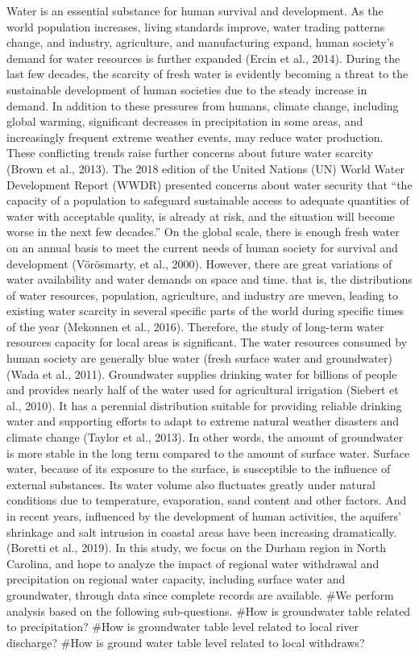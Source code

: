 \documentclass[
  12pt,
]{article}
\begin{document}
Water is an essential substance for human survival and development. As
the world population increases, living standards improve, water trading
patterns change, and industry, agriculture, and manufacturing expand,
human society's demand for water resources is further expanded (Ercin et
al., 2014). During the last few decades, the scarcity of fresh water is
evidently becoming a threat to the sustainable development of human
societies due to the steady increase in demand. In addition to these
pressures from humans, climate change, including global warming,
significant decreases in precipitation in some areas, and increasingly
frequent extreme weather events, may reduce water production. These
conflicting trends raise further concerns about future water scarcity
(Brown et al., 2013). The 2018 edition of the United Nations (UN) World
Water Development Report (WWDR) presented concerns about water security
that ``the capacity of a population to safeguard sustainable access to
adequate quantities of water with acceptable quality, is already at
risk, and the situation will become worse in the next few decades.'' On
the global scale, there is enough fresh water on an annual basis to meet
the current needs of human society for survival and development
(Vörösmarty, et al., 2000). However, there are great variations of water
availability and water demands on space and time. that is, the
distributions of water resources, population, agriculture, and industry
are uneven, leading to existing water scarcity in several specific parts
of the world during specific times of the year (Mekonnen et al., 2016).
Therefore, the study of long-term water resources capacity for local
areas is significant. The water resources consumed by human society are
generally blue water (fresh surface water and groundwater) (Wada et al.,
2011). Groundwater supplies drinking water for billions of people and
provides nearly half of the water used for agricultural irrigation
(Siebert et al., 2010). It has a perennial distribution suitable for
providing reliable drinking water and supporting efforts to adapt to
extreme natural weather disasters and climate change (Taylor et al.,
2013). In other words, the amount of groundwater is more stable in the
long term compared to the amount of surface water. Surface water,
because of its exposure to the surface, is susceptible to the influence
of external substances. Its water volume also fluctuates greatly under
natural conditions due to temperature, evaporation, sand content and
other factors. And in recent years, influenced by the development of
human activities, the aquifers' shrinkage and salt intrusion in coastal
areas have been increasing dramatically. (Boretti et al., 2019). In this
study, we focus on the Durham region in North Carolina, and hope to
analyze the impact of regional water withdrawal and precipitation on
regional water capacity, including surface water and groundwater,
through data since complete records are available. \#We perform analysis
based on the following sub-questions. \#How is groundwater table related
to precipitation? \#How is groundwater table level related to local
river discharge? \#How is ground water table level related to local
withdraws?
\end{document}

